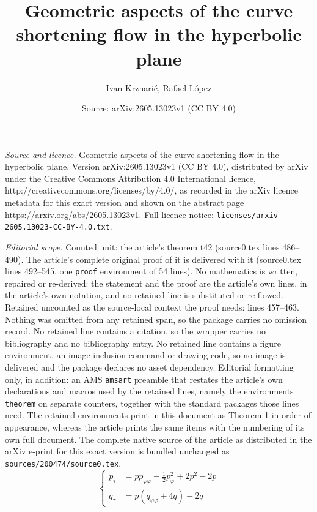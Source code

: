 \documentclass[10pt,a4paper]{amsart}
\title{Geometric aspects of the curve shortening flow in the hyperbolic plane}
\author{Ivan Krznari\'c, Rafael L\'opez}
\date{Source: arXiv:2605.13023v1 (CC BY 4.0)}
\begin{document}
\maketitle

\noindent\emph{Source and licence.} Geometric aspects of the curve shortening flow in the hyperbolic plane. Version arXiv:2605.13023v1 (CC BY 4.0), distributed by arXiv under the Creative Commons Attribution 4.0 International licence, http://creativecommons.org/licenses/by/4.0/, as recorded in the arXiv licence metadata for this exact version and shown on the abstract page https://arxiv.org/abs/2605.13023v1. Full licence notice: \texttt{licenses/arxiv-2605.13023-CC-BY-4.0.txt}.\par\smallskip

\noindent\textit{Editorial scope.} Counted unit: the article's theorem t42 (source0.tex lines 486--490). The article's complete original proof of it is delivered with it (source0.tex lines 492--545, one \texttt{proof} environment of 54 lines). No mathematics is written, repaired or re-derived: the statement and the proof are the article's own lines, in the article's own notation, and no retained line is substituted or re-flowed.  Retained uncounted as the source-local context the proof needs: lines 457--463.  Nothing was omitted from any retained span, so the package carries no omission record.  No retained line contains a citation, so the wrapper carries no bibliography and no bibliography entry.  No retained line contains a figure environment, an image-inclusion command or drawing code, so no image is delivered and the package declares no asset dependency.  Editorial formatting only, in addition: an AMS \texttt{amsart} preamble that restates the article's own declarations and macros used by the retained lines, namely the environments \texttt{theorem} on separate counters, together with the standard packages those lines need.  The retained environments print in this document as Theorem 1 in order of appearance, whereas the article prints the same items with the numbering of its own full document.  The complete native source of the article as distributed in the arXiv e-print for this exact version is bundled unchanged as \texttt{sources/200474/source0.tex}.
\begin{equation}\label{evo}
\left\{
\begin{split}
p_\tau &= p p_{\varphi \varphi} - \frac{1}{2}p_{\varphi}^2 + 2p^2 - 2p \\
 q_\tau&= p(q_{\varphi \varphi} + 4q) - 2 q
\end{split}\right.
\end{equation}
\end{document}
